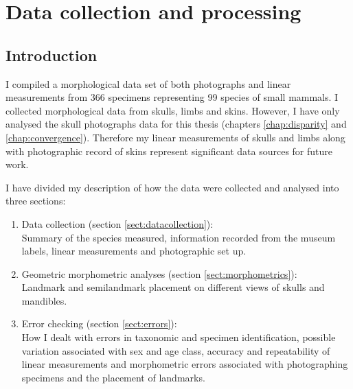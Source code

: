 
\chapter{Data collection and processing}
\label{chap:methods}

\section{Introduction}

	I compiled a morphological data set of both photographs and linear measurements from 366 specimens representing 99 species of small mammals. 
	I collected morphological data from skulls, limbs and skins. However, I have only analysed the skull photographs data for this thesis (chapters \ref{chap:disparity} and \ref{chap:convergence}). Therefore my linear measurements of skulls and limbs along with photographic record of skins represent significant data sources for future work. %
	
	I have divided my description of how the data were collected and analysed into three sections:
	
	\begin{enumerate}[i]
	
	\item Data collection (section \ref{sect:datacollection}): \\
	Summary of the species measured, information recorded from the museum labels, linear measurements and photographic set up.
	
	\item Geometric morphometric analyses (section \ref{sect:morphometrics}):\\
	Landmark and semilandmark placement on different views of skulls and mandibles.
	
	\item Error checking (section \ref{sect:errors}): \\
	How I dealt with errors in taxonomic and specimen identification, possible variation associated with sex and age class, accuracy and repeatability of linear measurements and morphometric errors associated with photographing specimens and the placement of landmarks.
	

	
	\end{enumerate} 


